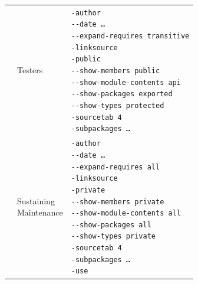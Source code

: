 \begin{longtable}{|l|l|X|}

\multirow{2}{*}{\makecell{\nameref{sec:Tool}\index{product type!tool}}} 
  & Testers
  & \makecell[l]{\texttt{-author}
  \\ \texttt{-{}-date …}
  \\ \texttt{-{}-expand-requires transitive}
  \\ \texttt{-linksource}
  \\ \texttt{-public} 
  \\ \texttt{-{}-show-members public}
  \\ \texttt{-{}-show-module-contents api}
  \\ \texttt{-{}-show-packages exported}
  \\ \texttt{-{}-show-types protected}
  \\ \texttt{-sourcetab 4}
  \\ \texttt{-subpackages …}
  } \\
\cline{2-3}
  & \makecell[l]{Sustaining \\
  Maintenance}
  & \makecell[l]{\texttt{-author}
  \\ \texttt{-{}-date …}
  \\ \texttt{-{}-expand-requires all}
  \\ \texttt{-linksource}
  \\ \texttt{-private} 
  \\ \texttt{-{}-show-members private}
  \\ \texttt{-{}-show-module-contents all}
  \\ \texttt{-{}-show-packages all}
  \\ \texttt{-{}-show-types private}
  \\ \texttt{-sourcetab 4}
  \\ \texttt{-subpackages …}
  \\ \texttt{-use}
  } \\
\hline



\end{longtable}
